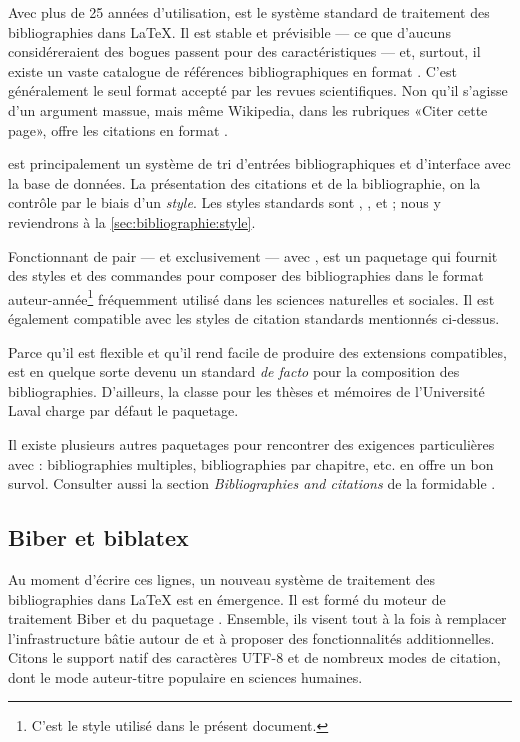 Avec plus de 25 années d'utilisation, {\BibTeX} \citep{bibtex} est le
système standard de traitement des bibliographies dans {\LaTeX}. Il
est stable et prévisible --- ce que d'aucuns considéreraient des
bogues passent pour des caractéristiques --- et, surtout, il existe un
vaste catalogue de références bibliographiques en format {\BibTeX}.
C'est généralement le seul format accepté par les revues
scientifiques. Non qu'il s'agisse d'un argument massue, mais même
Wikipedia, dans les rubriques «Citer cette page», offre les citations
en format {\BibTeX}.

{\BibTeX} est principalement un système de tri d'entrées
bibliographiques et d'interface avec la base de données. La
présentation des citations et de la bibliographie, on la contrôle par
le biais d'un \emph{style}. Les styles standards sont ,
,  et ; nous y reviendrons à la
\autoref{sec:bibliographie:style}.

Fonctionnant de pair --- et exclusivement --- avec {\BibTeX},
 \citep{natbib} est un paquetage qui fournit des styles et
des commandes pour composer des bibliographies dans le format
auteur-année\footnote{%
  C'est le style utilisé dans le présent document.} %
fréquemment utilisé dans les sciences naturelles et sociales. Il est
également compatible avec les styles de citation standards mentionnés
ci-dessus.

Parce qu'il est flexible et qu'il rend facile de produire des
extensions compatibles,  est en quelque sorte devenu un
standard \emph{de facto} pour la composition des bibliographies.
D'ailleurs, la classe  pour les thèses et mémoires de
l'Université Laval charge par défaut le paquetage.

Il existe plusieurs autres paquetages pour rencontrer des exigences
particulières avec {\BibTeX}: bibliographies multiples, bibliographies
par chapitre, etc. \citet{Mori:bibliographies:2009} en offre un bon
survol. Consulter aussi la section \emph{Bibliographies and citations}
de la formidable %
.


\subsection{Biber et biblatex}
\label{sec:bibliographie:systeme:biblatex}

Au moment d'écrire ces lignes, un nouveau système de traitement des
bibliographies dans {\LaTeX} est en émergence. Il est formé du moteur
de traitement Biber \citep{biber} et du paquetage 
\citep{biblatex}. Ensemble, ils visent tout à la fois à remplacer
l'infrastructure bâtie autour de {\BibTeX} et à proposer des
fonctionnalités additionnelles. Citons le support natif des caractères
UTF-8 et de nombreux modes de citation, dont le mode
auteur-titre populaire en sciences humaines.

